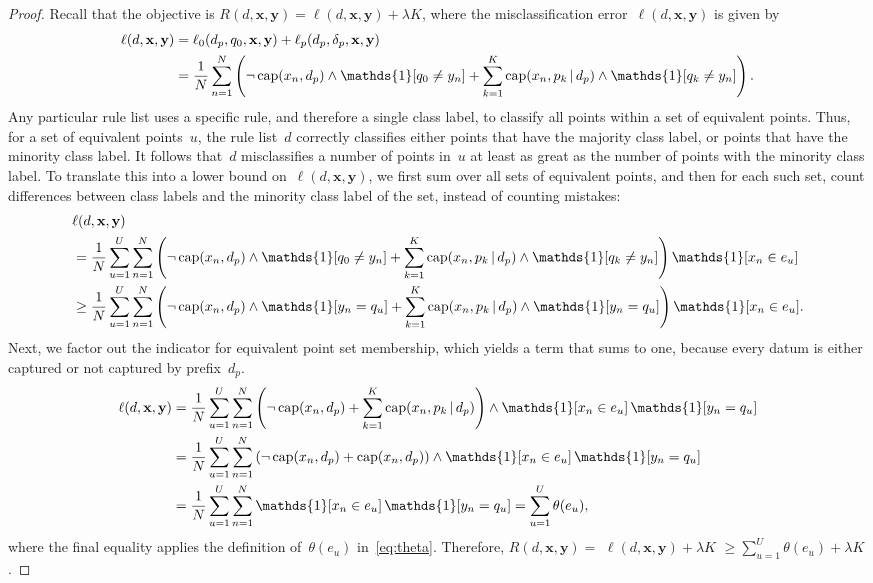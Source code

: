 \documentclass[twoside,11pt]{article}
\def\one{\mathds{1}}
\newcommand{\x}{\mathbf{x}}
\newcommand{\y}{\mathbf{y}}
\def\RL{{d}}
\def\Prefix{d_p}
\def\Labels{\delta_p}
\def\Default{q_0}
\def\Obj{R}
\def\Loss{\ell}
\def\Reg{{\lambda}}
\def\Cap{\textnormal{cap}}
\def\one{\mathds{1}}
\newcommand{\nn}{\nonumber}
\newcommand{\given}{\,|\,}
\begin{document}
\begin{arxiv}
\begin{proof}
Recall that the objective is ${\Obj(\RL, \x, \y) = \Loss(\RL, \x, \y) + \Reg K}$,
where the misclassification error~${\Loss(\RL, \x, \y)}$ is given by
\begin{align}
\Loss(\RL, \x, \y) &= \Loss_0(\Prefix, \Default, \x, \y) + \Loss_p(\Prefix, \Labels, \x, \y) \nn \\
&= \frac{1}{N} \sum_{n=1}^N \left( \neg\, \Cap(x_n, \Prefix) \wedge \one[q_0 \neq y_n]
   + \sum_{k=1}^K \Cap(x_n, p_k \given \Prefix) \wedge \one [q_k \neq y_n] \right). \nn
\end{align}
Any particular rule list uses a specific rule, and therefore a single class label,
to classify all points within a set of equivalent points.
%
Thus, for a set of equivalent points~$u$, the rule list~$\RL$ correctly classifies either
points that have the majority class label, or points that have the minority class label.
%
It follows that~$\RL$ misclassifies a number of points in~$u$ at least as great as
the number of points with the minority class label.
%
To translate this into a lower bound on~$\Loss(\RL, \x, \y)$,
we first sum over all sets of equivalent points, and then for each such set,
count differences between class labels and the minority class label of the set,
instead of counting mistakes:
\begin{align}
&\Loss(\RL, \x, \y) \nn \\
&= \frac{1}{N} \sum_{u=1}^U \sum_{n=1}^N \left( \neg\, \Cap(x_n, \Prefix) \wedge \one[q_0 \neq y_n]
   + \sum_{k=1}^K \Cap(x_n, p_k \given \Prefix) \wedge \one [q_k \neq y_n] \right)
   \one [x_n \in e_u]  \nn \\
&\ge \frac{1}{N} \sum_{u=1}^U \sum_{n=1}^N \left( \neg\, \Cap(x_n, \Prefix) \wedge \one[y_n = q_u]
   + \sum_{k=1}^K \Cap(x_n, p_k \given \Prefix) \wedge \one [y_n = q_u] \right)
   \one [x_n \in e_u].
\label{eq:lb-equiv-pts}
\end{align}
Next, we factor out the indicator for equivalent point set membership,
which yields a term that sums to one, because every datum is either captured or
not captured by prefix~$\Prefix$.
\begin{align}
\Loss(\RL, \x, \y) &= \frac{1}{N} \sum_{u=1}^U \sum_{n=1}^N \left( \neg\, \Cap(x_n, \Prefix)
   + \sum_{k=1}^K \Cap(x_n, p_k \given \Prefix) \right)
   \wedge \one [x_n \in e_u]\, \one[y_n = q_u] \nn \\
&= \frac{1}{N} \sum_{u=1}^U \sum_{n=1}^N \left( \neg\, \Cap(x_n, \Prefix)
   + \Cap(x_n, \Prefix) \right)
   \wedge \one [x_n \in e_u]\, \one[y_n = q_u] \nn \\
&= \frac{1}{N} \sum_{u=1}^U \sum_{n=1}^N \one [ x_n \in e_u ]\, \one [ y_n = q_u ]
= \sum_{u=1}^U \theta(e_u), \nn
\end{align}
where the final equality applies the definition of~$\theta(e_u)$ in~\eqref{eq:theta}.
%
Therefore, ${\Obj(\RL, \x, \y) =}$ ${\Loss(\RL, \x, \y) + \Reg K}$ ${\ge \sum_{u=1}^U \theta(e_u) + \Reg K}$.
\end{proof}
\end{arxiv}
\end{document}
